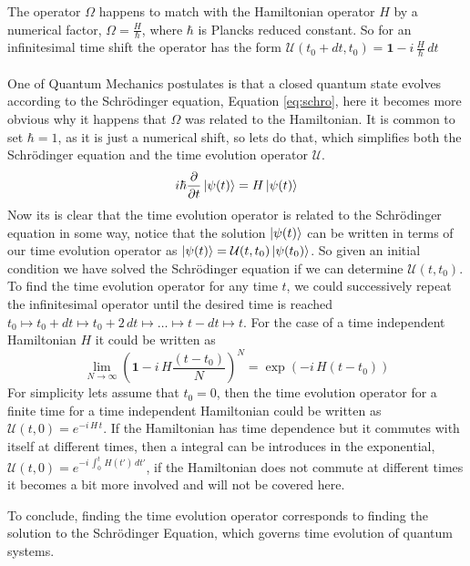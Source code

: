 The operator $\Omega$ happens  to match with the Hamiltonian operator $H$ by a numerical factor, $\Omega = \frac{H}{\hbar}$, where $\hbar$ is Plancks reduced constant. So for an infinitesimal time shift the operator has the form $\mathcal{U}(t_0 + dt, t_0) = \mathbf{1} - i\,\frac{H}{\hbar} \,dt$
\\
\\
One of Quantum Mechanics postulates is that a closed quantum state evolves according to the Schrödinger equation, Equation \ref{eq:schro}, here it becomes more obvious why it happens that $\Omega$ was related to the Hamiltonian. It is common to set $\hbar = 1$, as it is just a numerical shift, so lets do that, which simplifies both the Schrödinger equation and the time evolution operator $\mathcal{U}$. 
\begin{equation} 
i \hbar \pdv{}{t} \ket{\psi(t)} = H \ket{\psi(t)}
\label{eq:schro}
\end{equation} 
Now its is clear that the time evolution operator is related to the Schrödinger equation in some way, notice that the solution $\ket{\psi(t)}$ can be written in terms of our time evolution operator as
$\ket{\psi(t)} = \mathcal{U}(t,t_0)\ket{\psi(t_0)}$. So given an initial condition we have solved the Schrödinger equation if we can determine $\mathcal{U}(t,t_0)$.  
To find the time evolution operator for any time $t$, we could successively repeat the infinitesimal operator until the desired time is reached $t_0 \mapsto t_0 + dt \mapsto t_0 + 2\,dt \mapsto \dots \mapsto t - dt \mapsto t$. For the case of a time independent Hamiltonian $H$ it could be written as
\begin{equation}
\lim_{N \rightarrow \infty} \left(\mathbf{1} - i\,H\frac{(t-t_0)}{N} \right)^N = \exp\left(- i\,H(t-t_0) \right)
\end{equation}
For simplicity lets assume that $t_0 = 0$, then the time evolution operator for a finite time for a time independent Hamiltonian could be written as $\mathcal{U}(t,0) = e^{-i\,H\,t}$. If the Hamiltonian has time dependence but it commutes with itself at different times, then a integral can be introduces in the exponential, $\mathcal{U}(t,0) = e^{-i\,\int_0^t \,H(t')\, dt'}$, if the Hamiltonian does not commute at different times it becomes a bit more involved and will not be covered here. 

To conclude, finding the time evolution operator corresponds to finding the solution to the Schrödinger Equation, which governs time evolution of quantum systems.








